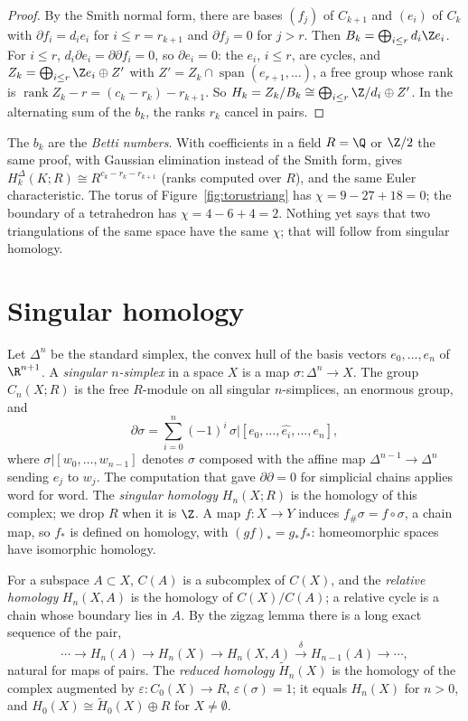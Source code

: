 \begin{proof}
By the Smith normal form, there are bases $(f_j)$ of $C_{k+1}$ and $(e_i)$ of $C_k$ with $\partial f_i=d_ie_i$ for $i\le r=r_{k+1}$ and $\partial f_j=0$ for $j>r$. Then $B_k=\bigoplus_{i\le r}d_i\Z e_i$. For $i\le r$,
$d_i\partial e_i=\partial\partial f_i=0$, so $\partial e_i=0$: the $e_i$, $i\le r$, are cycles, and $Z_k=\bigoplus_{i\le r}\Z e_i\oplus Z'$ with $Z'=Z_k\cap\operatorname{span}(e_{r+1},\dots)$, a free group whose rank is
$\operatorname{rank}Z_k-r=(c_k-r_k)-r_{k+1}$. So $H_k=Z_k/B_k\cong\bigoplus_{i\le r}\Z/d_i\oplus Z'$. In the alternating sum of the $b_k$, the ranks $r_k$ cancel in pairs.
\end{proof}

The $b_k$ are the \emph{Betti numbers}. With coefficients in a field $R=\Q$ or $\Z/2$ the same proof, with Gaussian elimination instead of the Smith form, gives $H^\Delta_k(K;R)\cong R^{c_k-r_k-r_{k+1}}$ (ranks
computed over $R$), and the same Euler characteristic. The torus of Figure~\ref{fig:torustriang} has $\chi=9-27+18=0$; the boundary of a tetrahedron has $\chi=4-6+4=2$. Nothing yet says that
two triangulations of the same space have the same $\chi$; that will follow from singular homology.

\section{Singular homology}

Let $\Delta^n$ be the standard simplex, the convex hull of the basis vectors $e_0,\dots,e_n$ of $\R^{n+1}$. A \emph{singular $n$-simplex} in a space $X$ is a map $\sigma\colon\Delta^n\to X$. The group $C_n(X;R)$ is the
free $R$-module on all singular $n$-simplices, an enormous group, and
\[\partial\sigma=\sum_{i=0}^n(-1)^i\,\sigma|[e_0,\dots,\widehat{e_i},\dots,e_n],\]
where $\sigma|[w_0,\dots,w_{n-1}]$ denotes $\sigma$ composed with the affine map $\Delta^{n-1}\to\Delta^n$ sending $e_j$ to $w_j$. The computation that gave $\partial\partial=0$ for simplicial chains applies word for
word. The \emph{singular homology} $H_n(X;R)$ is the homology of this complex; we drop $R$ when it is $\Z$. A map $f\colon X\to Y$ induces $f_\#\sigma=f\circ\sigma$, a chain map, so $f_*$ is defined on homology,
with $(gf)_*=g_*f_*$: homeomorphic spaces have isomorphic homology.

For a subspace $A\subset X$, $C(A)$ is a subcomplex of $C(X)$, and the \emph{relative homology} $H_n(X,A)$ is the homology of $C(X)/C(A)$; a relative cycle is a chain whose boundary lies in $A$. By
the zigzag lemma there is a long exact sequence of the pair,
\[\cdots\to H_n(A)\to H_n(X)\to H_n(X,A)\xrightarrow{\delta}H_{n-1}(A)\to\cdots,\]
natural for maps of pairs. The \emph{reduced homology} $\tilde H_n(X)$ is the homology of the complex augmented by $\varepsilon\colon C_0(X)\to R$, $\varepsilon(\sigma)=1$; it equals $H_n(X)$ for $n>0$, and
$H_0(X)\cong\tilde H_0(X)\oplus R$ for $X\ne\emptyset$.

